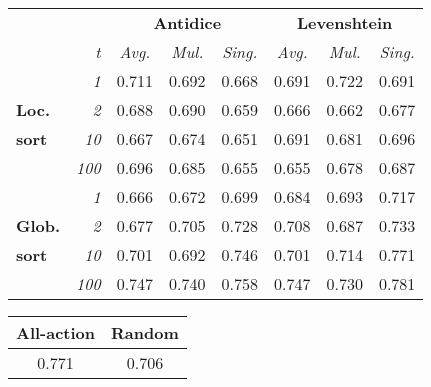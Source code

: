 \begin{small}
\begin{tabular}{l r  c c c  c c c}
\multicolumn{2}{r}{ } & \multicolumn{3}{c}{\textbf{Antidice}} &  \multicolumn{3}{c}{\textbf{Levenshtein}}  \\
& \textit{t} & \textit{Avg.} & \textit{Mul.} & \textit{Sing.} & \textit{Avg.} & \textit{Mul.} & \textit{Sing.}\\	
\hline
              & \textit{1} 	& 0.711 & 0.692 & 0.668 & 0.691 & 0.722 & 0.691 \\
\textbf{Loc.} & \textit{2} 	& 0.688 & 0.690 & 0.659 & 0.666 & 0.662 & 0.677 \\
\textbf{sort} & \textit{10} 	& 0.667 & 0.674 & 0.651 & 0.691 & 0.681 & 0.696 \\
              & \textit{100}	& 0.696 & 0.685 & 0.655 & 0.655 & 0.678 & 0.687 \\
              & \textit{1} 	& 0.666 & 0.672 & 0.699 & 0.684 & 0.693 & 0.717 \\
\textbf{Glob.}& \textit{2} 	& 0.677 & 0.705 & 0.728 & 0.708 & 0.687 & 0.733 \\
\textbf{sort} & \textit{10} 	& 0.701 & 0.692 & 0.746 & 0.701 & 0.714 & 0.771 \\
              & \textit{100}	&  0.747 & 0.740 & 0.758 & 0.747 & 0.730 & 0.781  \\
\hline
\end{tabular}

\begin{tabular}{c c}
\textbf{All-action}	& \textbf{Random}	\\
\hline
 0.771 & 0.706 \\
\hline
\end{tabular}

\end{small}
